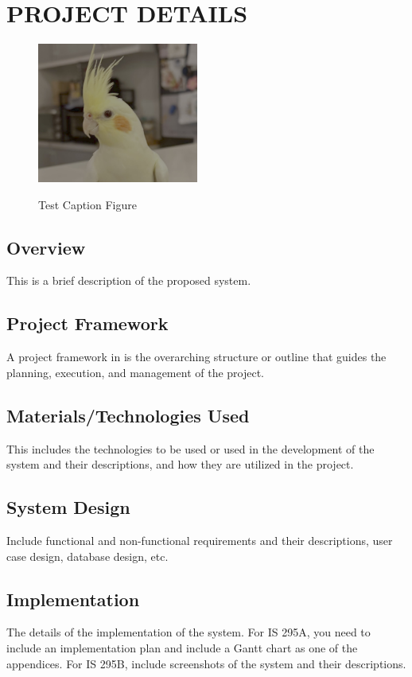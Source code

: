 
\section{PROJECT DETAILS}
    \lipsum[6]
    \begin{figure}[ht]
    \begin{center}
        \vspace{4ex}
        \includegraphics[width=200px]{Texfiles/images/ranger.png}
        \label{fig:Test Caption Figure}	
        \caption{Test Caption Figure}
    \end{center}
    \end{figure}
    \lipsum[4]
        \subsection{Overview}
        This is a brief description of the proposed system.
        \subsection{Project Framework}
        A project framework in is the overarching structure or outline that guides the planning, execution, and management of the project. 
        \subsection{Materials/Technologies Used}
        This includes the technologies to be used or used in the development of the system and their descriptions, and how they are utilized in the project.
        \subsection{System Design}
        Include functional and non-functional requirements and their descriptions, user case design, database design, etc. 
        \subsection{Implementation}
        The details of the implementation of the system. For IS 295A, you need to include an implementation plan and include a Gantt chart as one of the appendices. For IS 295B, include screenshots of the system and their descriptions.
